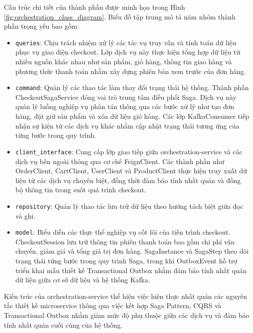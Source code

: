 Cấu trúc chi tiết của thành phần được minh họa trong Hình \ref{fig:orchestration_class_diagram}. Biểu đồ tập trung mô tả năm nhóm thành phần trọng yếu bao gồm:

\begin{itemize}

\item \texttt{queries}: Chịu trách nhiệm xử lý các tác vụ truy vấn và tính toán dữ liệu phục vụ giao diện checkout. Lớp dịch vụ này thực hiện tổng hợp dữ liệu từ nhiều nguồn khác nhau như sản phẩm, giỏ hàng, thông tin giao hàng và phương thức thanh toán nhằm xây dựng phiên bản xem trước của đơn hàng.

\item \texttt{command}: Quản lý các thao tác làm thay đổi trạng thái hệ thống. Thành phần CheckoutSagaService đóng vai trò trung tâm điều phối Saga. Dịch vụ này quản lý luồng nghiệp vụ phân tán thông qua các bước xử lý như tạo đơn hàng, đặt giữ sản phẩm và xóa dữ liệu giỏ hàng. Các lớp KafkaConsumer tiếp nhận sự kiện từ các dịch vụ khác nhằm cập nhật trạng thái tương ứng của từng bước trong quy trình.

\item \texttt{client\_interface}: Cung cấp lớp giao tiếp giữa orchestration-service và các dịch vụ bên ngoài thông qua cơ chế FeignClient. Các thành phần như OrderClient, CartClient, UserClient và ProductClient thực hiện truy xuất dữ liệu từ các dịch vụ chuyên biệt, đồng thời đảm bảo tính nhất quán và đồng bộ thông tin trong suốt quá trình checkout.

\item \texttt{repository}: Quản lý thao tác lưu trữ dữ liệu theo hướng tách biệt giữa đọc và ghi. 

\item \texttt{model}: Biểu diễn các thực thể nghiệp vụ cốt lõi của tiến trình checkout. CheckoutSession lưu trữ thông tin phiên thanh toán bao gồm chi phí vận chuyển, giảm giá và tổng giá trị đơn hàng. SagaInstance và SagaStep theo dõi trạng thái từng bước trong quy trình Saga, trong khi OutboxEvent hỗ trợ triển khai mẫu thiết kế Transactional Outbox nhằm đảm bảo tính nhất quán dữ liệu giữa cơ sở dữ liệu và hệ thống Kafka.

\end{itemize}

Kiến trúc của orchestration-service thể hiện việc hiện thực nhất quán các nguyên tắc thiết kế microservice thông qua việc kết hợp Saga Pattern, CQRS và Transactional Outbox nhằm giảm mức độ phụ thuộc giữa các dịch vụ và đảm bảo tính nhất quán cuối cùng của hệ thống.

